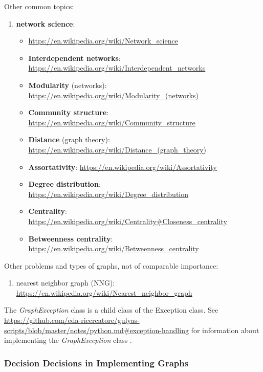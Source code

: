 Other common topics: \vspace{-0.3cm}
\begin{enumerate} \itemsep -4pt
\item {\bf network science}: \vspace{-0.3cm}
	\begin{itemize} \itemsep -2pt
	\item \url{https://en.wikipedia.org/wiki/Network_science}
	\item {\bf Interdependent networks}: \url{https://en.wikipedia.org/wiki/Interdependent_networks}
	\item {\bf Modularity} (networks): \url{https://en.wikipedia.org/wiki/Modularity_(networks)}
	\item {\bf Community structure}: \url{https://en.wikipedia.org/wiki/Community_structure}
	\item {\bf Distance} (graph theory): \url{https://en.wikipedia.org/wiki/Distance_(graph_theory)}
	\item {\bf Assortativity}: \url{https://en.wikipedia.org/wiki/Assortativity}
	\item {\bf Degree distribution}: \url{https://en.wikipedia.org/wiki/Degree_distribution}
	\item {\bf Centrality}: \url{https://en.wikipedia.org/wiki/Centrality#Closeness_centrality}
	\item {\bf Betweenness centrality}: \url{https://en.wikipedia.org/wiki/Betweenness_centrality}
	\end{itemize}
\end{enumerate}



Other problems and types of graphs, not of comparable importance: \vspace{-0.3cm}
\begin{enumerate} \itemsep -4pt
\item nearest neighbor graph (NNG): \url{https://en.wikipedia.org/wiki/Nearest_neighbor_graph}
\end{enumerate}



The {\it GraphException} class is a child class of the Exception class. See \url{https://github.com/eda-ricercatore/gulyas-scripts/blob/master/notes/python.md#exception-handling} for information about implementing the {\it GraphException} class \cite[\S52.4, pp. 849]{Goldman2008}.


\subsubsection{Decision Decisions in Implementing Graphs}
\label{sssec:DecisionDecisionsInImplementingGraphs}

